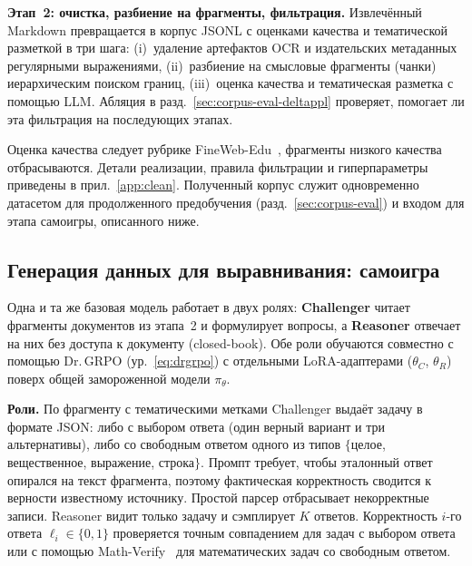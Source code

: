 \documentclass{article}
\begin{document}
\textbf{Этап~2: очистка, разбиение на фрагменты, фильтрация.}\label{sec:corpus-filter}
Извлечённый Markdown превращается в корпус JSONL с оценками качества и тематической разметкой в три шага: (i)~удаление артефактов OCR и издательских метаданных регулярными выражениями, (ii)~разбиение на смысловые фрагменты (чанки) иерархическим поиском границ, (iii)~оценка качества и тематическая разметка с помощью LLM. Абляция в разд.~\ref{sec:corpus-eval-deltappl} проверяет, помогает ли эта фильтрация на последующих этапах.

Оценка качества следует рубрике FineWeb-Edu~\cite{penedo2024fineweb}, фрагменты низкого качества отбрасываются. Детали реализации, правила фильтрации и гиперпараметры приведены в прил.~\ref{app:clean}. Полученный корпус служит одновременно датасетом для продолженного предобучения (разд.~\ref{sec:corpus-eval}) и входом для этапа самоигры, описанного ниже.

\subsection{Генерация данных для выравнивания: самоигра}\label{sec:method-selfplay}

Одна и та же базовая модель работает в двух ролях: \textbf{Challenger} читает фрагменты документов из этапа~2 и формулирует вопросы, а \textbf{Reasoner} отвечает на них без доступа к документу (closed-book). Обе роли обучаются совместно с помощью Dr.\,GRPO (ур.~\eqref{eq:drgrpo}) с отдельными LoRA-адаптерами ($\theta_C$, $\theta_R$) поверх общей замороженной модели $\pi_\theta$.

\textbf{Роли.} По фрагменту с тематическими метками Challenger выдаёт задачу в формате JSON: либо с выбором ответа (один верный вариант и три альтернативы), либо со свободным ответом одного из типов $\{$целое, вещественное, выражение, строка$\}$. Промпт требует, чтобы эталонный ответ опирался на текст фрагмента, поэтому фактическая корректность сводится к верности известному источнику. Простой парсер отбрасывает некорректные записи. Reasoner видит только задачу и сэмплирует $K$ ответов. Корректность $i$-го ответа $\ell_i \in \{0, 1\}$ проверяется точным совпадением для задач с выбором ответа или с помощью Math-Verify~\cite{mathverify} для математических задач со свободным ответом.
\end{document}
